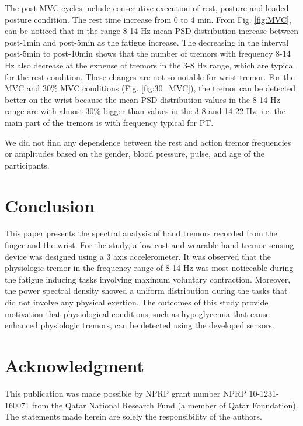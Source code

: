 \documentclass[conference, a4paper]{IEEEtran}
\begin{document}
The post-MVC cycles include consecutive execution of rest, posture and loaded posture condition. The rest time increase from 0 to 4 min. From Fig. \ref{fig:MVC}, can be noticed that in the range 8-14 Hz mean PSD distribution increase between post-1min and post-5min as the fatigue increase. The decreasing in the interval post-5min to post-10min shows that the number of tremors with frequency 8-14 Hz also decrease at the expense of tremors in the 3-8 Hz range, which are typical for the rest condition. These changes are not so notable for wrist tremor. For the MVC and 30\% MVC conditions (Fig. \ref{fig:30_MVC}), the tremor can be detected better on the wrist because the mean PSD distribution values in the 8-14 Hz range are with almost 30\% bigger than values in the 3-8 and 14-22 Hz, i.e. the main part of the tremors is with frequency typical for PT.

We did not find any dependence between the rest and action tremor frequencies or amplitudes based on the gender, blood pressure, pulse, and age of the participants.
%
\section{Conclusion}
%
This paper presents the spectral analysis of hand tremors recorded from the finger and the wrist. For the study, a low-cost and wearable hand tremor sensing device was designed using a 3 axis accelerometer. It was observed that the physiologic tremor in the frequency range of 8-14 Hz was most noticeable during the fatigue inducing tasks involving maximum voluntary contraction. Moreover, the power spectral density showed a uniform distribution during the tasks that did not involve any physical exertion. The outcomes of this study provide motivation that physiological conditions, such as hypoglycemia that cause enhanced physiologic tremors, can be detected using the developed sensors.
\section{Acknowledgment}
%
This publication was made possible by NPRP grant number NPRP 10-1231-160071 from the Qatar National Research Fund (a member of Qatar Foundation). The statements made herein are solely the responsibility of the authors.
%


\end{document}
